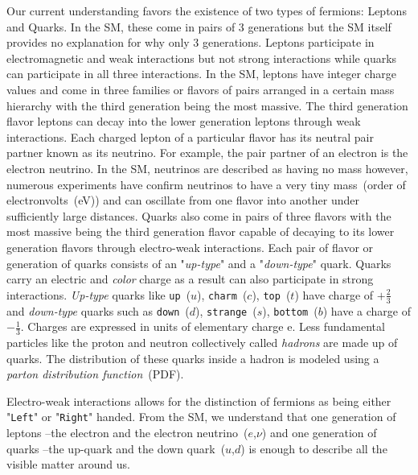 Our current understanding favors the existence of two types of fermions: Leptons and Quarks. In the SM, these come in pairs of 3 generations but the SM itself provides no explanation for why only 3 generations.
Leptons participate in electromagnetic and weak interactions but not strong interactions while quarks can participate in all three interactions. In the SM, leptons have integer charge values and come in three families or flavors of pairs arranged in a certain mass hierarchy with the third generation being the most massive. The third generation flavor leptons can decay into the lower generation leptons through weak interactions. Each charged lepton of a particular flavor has its neutral pair partner known as its neutrino. For example, the pair partner of an electron is the electron neutrino. In the SM, neutrinos are described as having no mass however, numerous experiments have confirm neutrinos to have a very tiny mass~(order of electronvolts~(eV)) and can oscillate from one flavor into another under sufficiently large distances.
\newline
Quarks also come in pairs of three flavors with the most massive being the third generation flavor capable of decaying to its lower generation flavors through electro-weak interactions. Each pair of flavor or generation of quarks consists of an "\textit{up-type}" and a "\textit{down-type}" quark. Quarks carry an electric and \textit{color} charge as a result can also participate in strong interactions. \textit{Up-type} quarks like \texttt{up}~($u$), \texttt{charm}~($c$), \texttt{top}~($t$) have charge of $+\frac{2}{3}$ and \textit{down-type} quarks such as \texttt{down}~($d$), \texttt{strange}~($s$), \texttt{bottom}~($b$) have a charge of $-\frac{1}{3}$. Charges are expressed in units of elementary charge e.
Less fundamental particles like the proton  and neutron collectively called \textit{hadrons} are made up of quarks. The distribution of these quarks inside a hadron is modeled using a \textit{parton distribution function}~(PDF). 


Electro-weak interactions allows for the distinction of fermions as being either "\texttt{Left}" or "\texttt{Right}" handed.  
From the SM, we understand that one generation of leptons --the electron and the electron neutrino~($e$,$\nu$) and one generation of quarks --the up-quark and the down quark~($u$,$d$) is enough to describe all the visible matter around us.
